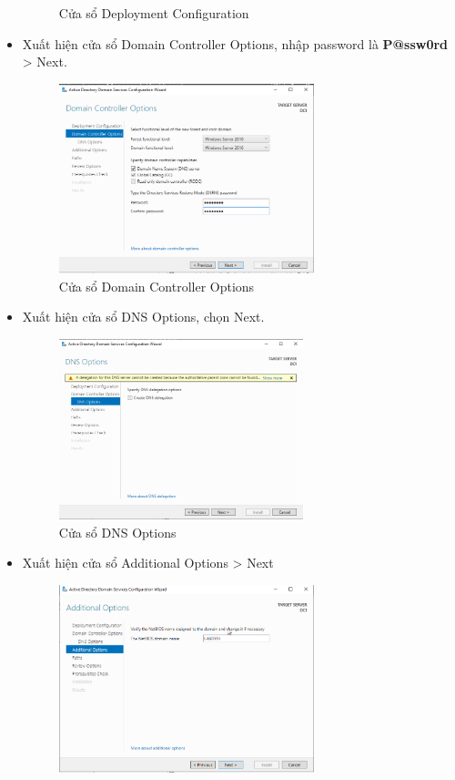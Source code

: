 \documentclass[13pt]{report}
\begin{document}
\begin{itemize}
\begin{figure}[htp]
			\caption{Cửa sổ Deployment Configuration}
		\end{figure}
		\newpage
		\item Xuất hiện cửa sổ Domain Controller Options, nhập password là \textbf{P@ssw0rd} > Next.
		\begin{figure}[htp]
			\centering
			\includegraphics[width=0.7\textwidth]{image/Gui/ADDC/12.png}
			\caption{Cửa sổ Domain Controller Options}
		\end{figure}
		\item Xuất hiện cửa sổ DNS Options, chọn Next.
		\begin{figure}[htp]
			\centering
			\includegraphics[width=0.67\textwidth]{image/Gui/ADDC/13.png}
			\caption{Cửa sổ DNS Options}
		\end{figure}
		\newpage
		\item Xuất hiện cửa sổ Additional Options > Next
		\begin{figure}[htp]
			\centering
			\includegraphics[width=0.7\textwidth]{image/Gui/ADDC/14.png}

\end{figure}
\end{itemize}
\end{document}
